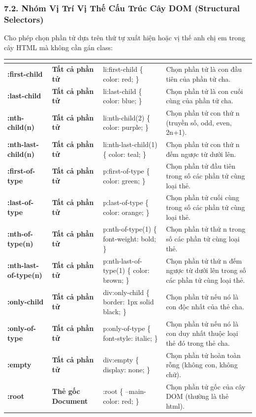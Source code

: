 \subsubsection{7.2. Nhóm Vị Trí Vị Thế Cấu Trúc Cây DOM (Structural Selectors)}

Cho phép chọn phần tử dựa trên thứ tự xuất hiện hoặc vị thế anh chị em trong cây HTML mà không cần gán class:

\begin{prettyTableBox}
\sffamily\small
\begin{tabularx}{\linewidth}{|>{\ttfamily\color{primaryBlue}\bfseries}K{3.6cm}|>{\sffamily\small\bfseries}K{2.2cm}|>{\ttfamily\small}K{4.5cm}|Z|}
\hline
{}  &  &  &  \\
\hline
:first-child & Tất cả phần tử & li:first-child \{ color: red; \} & Chọn phần tử là con đầu tiên của phần tử cha. \\
\hline
:last-child & Tất cả phần tử & li:last-child \{ color: blue; \} & Chọn phần tử là con cuối cùng của phần tử cha. \\
\hline
:nth-child(n) & Tất cả phần tử & li:nth-child(2) \{ color: purple; \} & Chọn phần tử con thứ n (truyền số, odd, even, 2n+1). \\
\hline
:nth-last-child(n) & Tất cả phần tử & li:nth-last-child(1) \{ color: teal; \} & Chọn phần tử con thứ n đếm ngược từ dưới lên. \\
\hline
:first-of-type & Tất cả phần tử & p:first-of-type \{ color: green; \} & Chọn phần tử đầu tiên trong số các phần tử cùng loại thẻ. \\
\hline
:last-of-type & Tất cả phần tử & p:last-of-type \{ color: orange; \} & Chọn phần tử cuối cùng trong số các phần tử cùng loại thẻ. \\
\hline
:nth-of-type(n) & Tất cả phần tử & p:nth-of-type(1) \{ font-weight: bold; \} & Chọn phần tử thứ n trong số các phần tử cùng loại thẻ. \\
\hline
:nth-last-of-type(n) & Tất cả phần tử & p:nth-last-of-type(1) \{ color: brown; \} & Chọn phần tử thứ n đếm ngược từ dưới lên trong số các phần tử cùng loại thẻ. \\
\hline
:only-child & Tất cả phần tử & div:only-child \{ border: 1px solid black; \} & Chọn phần tử nếu nó là con độc nhất của thẻ cha. \\
\hline
:only-of-type & Tất cả phần tử & p:only-of-type \{ font-style: italic; \} & Chọn phần tử nếu nó là con duy nhất thuộc loại thẻ đó trong thẻ cha. \\
\hline
:empty & Tất cả phần tử & div:empty \{ display: none; \} & Chọn phần tử hoàn toàn rỗng (không con, không chữ). \\
\hline
:root & Thẻ gốc Document & :root \{ --main-color: red; \} & Chọn phần tử gốc của cây DOM (thường là thẻ html). \\
\hline
\end{tabularx}
\end{prettyTableBox}

